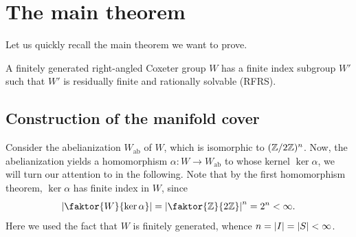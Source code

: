 \chapter{The main theorem}

Let us quickly recall the main theorem we want to prove.

\begin{theorem*}
    A finitely generated right-angled Coxeter group \(W\) has a finite index subgroup \(W'\) such that \(W'\) is residually finite and rationally solvable (RFRS).
\end{theorem*}



\section{Construction of the manifold cover}

Consider the abelianization \(W_{\text{ab}}\) of \(W\), which is isomorphic to \((\mathbb{Z}/2\mathbb{Z})^{n}\).
Now, the abelianization yields a homomorphism \(\alpha : W \to W_{\text{ab}}\) to whose kernel \(\ker\alpha\), we will turn our attention to in the following.
Note that by the first homomorphism theorem, \(\ker\alpha\) has finite index in \(W\), since
\[\abs{\faktor{W}{\ker\alpha}} = \abs{\faktor{\Z}{2\Z}}^{n} = 2^{n} < \infty.\]
Here we used the fact that \(W\) is finitely generated, whence \(n = \left\vert I\right\vert = \left\vert S\right\vert < \infty\).

